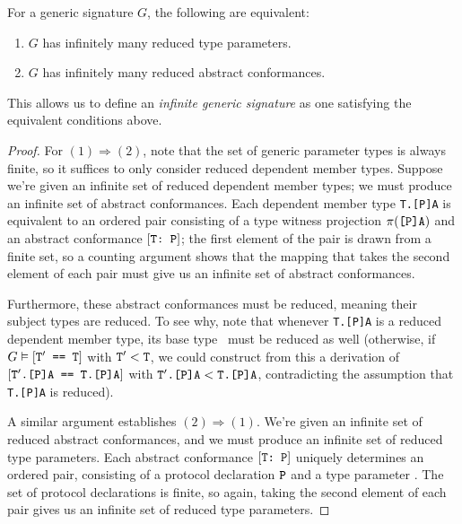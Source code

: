 \documentclass[../generics]{subfiles}
\begin{document}
\begin{proposition}\label{infinite signature lemma} For a generic signature $G$, the following are equivalent:
\begin{enumerate}
\item $G$ has infinitely many reduced type parameters.
\item $G$ has infinitely many reduced abstract conformances.
\end{enumerate}
This allows us to define an \emph{infinite generic signature} as one satisfying the equivalent conditions above.
\end{proposition}
\begin{proof}
For $(1)\Rightarrow(2)$, note that the set of generic parameter types is always finite, so it suffices to only consider reduced dependent member types. Suppose we're given an infinite set of reduced dependent member types; we must produce an infinite set of abstract conformances. Each dependent member type \texttt{T.[P]A} is equivalent to an ordered pair consisting of a type witness projection $\pi(\texttt{[P]A})$ and an abstract conformance $[\texttt{T:~P}]$; the first element of the pair is drawn from a finite set, so a counting argument shows that the mapping that takes the second element of each pair must give us an infinite set of abstract conformances.

Furthermore, these abstract conformances must be reduced, meaning their subject types are reduced. To see why, note that whenever \texttt{T.[P]A} is a reduced dependent member type, its base type \tT\ must be reduced as well (otherwise, if $G\vDash[\texttt{$\texttt{T}^\prime$ == T}]$ with $\texttt{T}^\prime<\texttt{T}$, we could construct from this a derivation of $[\texttt{$\texttt{T}^\prime$.[P]A == T.[P]A}]$ with $\texttt{$\texttt{T}^\prime$.[P]A} < \texttt{T.[P]A}$, contradicting the assumption that \texttt{T.[P]A} is reduced).

A similar argument establishes $(2)\Rightarrow(1)$. We're given an infinite set of reduced abstract conformances, and we must produce an infinite set of reduced type parameters. Each abstract conformance $[\texttt{T:~P}]$ uniquely determines an ordered pair, consisting of a protocol declaration $\texttt{P}$ and a type parameter \tT. The set of protocol declarations is finite, so again, taking the second element of each pair gives us an infinite set of reduced type parameters.
\end{proof}
\end{document}
